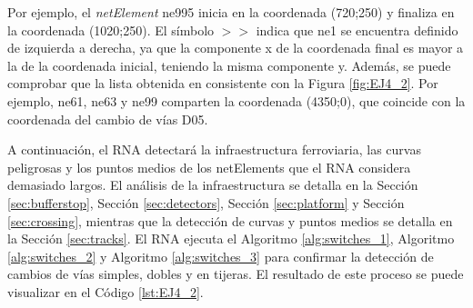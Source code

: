 Por ejemplo, el \textit{netElement} ne995 inicia en la coordenada (720;250) y finaliza en la coordenada (1020;250). El símbolo $>>$ indica que ne1 se encuentra definido de izquierda a derecha, ya que la componente x de la coordenada final es mayor a la de la coordenada inicial, teniendo la misma componente y. Además, se puede comprobar que la lista obtenida en consistente con la Figura \ref{fig:EJ4_2}. Por ejemplo, ne61, ne63 y ne99 comparten la coordenada (4350;0), que coincide con la coordenada del cambio de vías D05.

A continuación, el RNA detectará la infraestructura ferroviaria, las curvas peligrosas y los puntos medios de los netElements que el RNA considera demasiado largos. El análisis de la infraestructura se detalla en la Sección \ref{sec:bufferstop}, Sección \ref{sec:detectors}, Sección \ref{sec:platform} y Sección \ref{sec:crossing}, mientras que la detección de curvas y puntos medios se detalla en la Sección \ref{sec:tracks}. El RNA ejecuta el Algoritmo \ref{alg:switches_1}, Algoritmo \ref{alg:switches_2} y Algoritmo \ref{alg:switches_3} para confirmar la detección de cambios de vías simples, dobles y en tijeras. El resultado de este proceso se puede visualizar en el Código \ref{lst:EJ4_2}.

